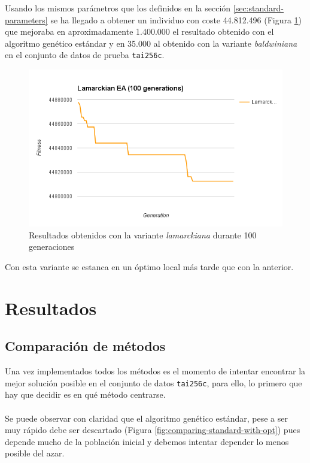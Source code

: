 Usando los mismos parámetros que los definidos en la sección \ref{sec:standard-parameters} se ha llegado a obtener un individuo con coste 44.812.496 (Figura \ref{fig:lamarckian-ea}) que mejoraba en aproximadamente 1.400.000 el resultado obtenido con el algoritmo genético estándar y en 35.000 al obtenido con la variante \textit{baldwiniana} en el conjunto de datos de prueba \texttt{tai256c}.

\begin{figure}[H]
	\centering
	\includegraphics[width=14cm]{img/lamarckian-ea}
	\caption{Resultados obtenidos con la variante \textit{lamarckiana} durante 100 generaciones}
	\label{fig:lamarckian-ea}
\end{figure}

Con esta variante se estanca en un óptimo local más tarde que con la anterior.

\section{Resultados}

\label{sec:comparacion-metodos}
\subsection{Comparación de métodos}

Una vez implementados todos los métodos es el momento de intentar encontrar la mejor solución posible en el conjunto de datos \texttt{tai256c}, para ello, lo primero que hay que decidir es en qué método centrarse.
\\
\\
Se puede observar con claridad que el algoritmo genético estándar, pese a ser muy rápido debe ser descartado (Figura \ref{fig:comparing-standard-with-opt}) pues depende mucho de la población inicial y debemos intentar depender lo menos posible del azar.

